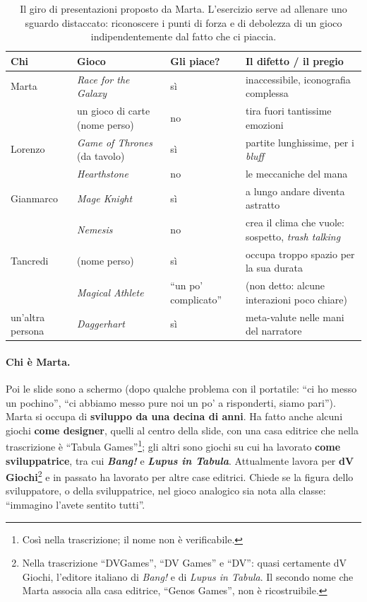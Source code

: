 \begin{table}[htbp]
\centering
\small
\begin{tabular}{@{}p{2.1cm}p{3.3cm}p{3.2cm}p{4.6cm}@{}}
\toprule
\textbf{Chi} & \textbf{Gioco} & \textbf{Gli piace?} & \textbf{Il difetto / il pregio} \\
\midrule
Marta & \emph{Race for the Galaxy} & sì & inaccessibile, iconografia complessa \\
      & un gioco di carte (nome perso) & no & tira fuori tantissime emozioni \\
\addlinespace
Lorenzo & \emph{Game of Thrones} (da tavolo) & sì & partite lunghissime, per i \emph{bluff} \\
        & \emph{Hearthstone} & no & le meccaniche del mana \\
\addlinespace
Gianmarco & \emph{Mage Knight} & sì & a lungo andare diventa astratto \\
          & \emph{Nemesis} & no & crea il clima che vuole: sospetto, \emph{trash talking} \\
\addlinespace
Tancredi & (nome perso) & sì & occupa troppo spazio per la sua durata \\
         & \emph{Magical Athlete} & ``un po' complicato'' & (non detto: alcune
         interazioni poco chiare) \\
\addlinespace
un'altra persona & \emph{Daggerhart} & sì & meta-valute nelle mani del narratore \\
\bottomrule
\end{tabular}
\caption{Il giro di presentazioni proposto da Marta. L'esercizio serve ad allenare uno
sguardo distaccato: riconoscere i punti di forza e di debolezza di un gioco
indipendentemente dal fatto che ci piaccia.}
\label{a13:tab:giro}
\end{table}

\paragraph{Chi è Marta.} Poi le slide sono a schermo (dopo qualche problema con il
portatile: ``ci ho messo un pochino'', ``ci abbiamo messo pure noi un po' a risponderti,
siamo pari''). Marta si occupa di \textbf{sviluppo da una decina di anni}. Ha fatto anche
alcuni giochi \textbf{come designer}, quelli al centro della slide, con una casa editrice
che nella trascrizione è ``Tabula Games''\footnote{Così nella trascrizione; il nome non
è verificabile.}; gli altri sono giochi su cui ha lavorato \textbf{come sviluppatrice},
tra cui \textbf{\emph{Bang!}} e \textbf{\emph{Lupus in Tabula}}. Attualmente lavora per
\textbf{dV Giochi}\footnote{Nella trascrizione ``DVGames'', ``DV Games'' e ``DV'': quasi
certamente dV Giochi, l'editore italiano di \emph{Bang!} e di \emph{Lupus in Tabula}. Il
secondo nome che Marta associa alla casa editrice, ``Genos Games'', non è
ricostruibile.} e in passato ha lavorato per altre case editrici. Chiede se la figura
dello sviluppatore, o della sviluppatrice, nel gioco analogico sia nota alla classe:
``immagino l'avete sentito tutti''.

